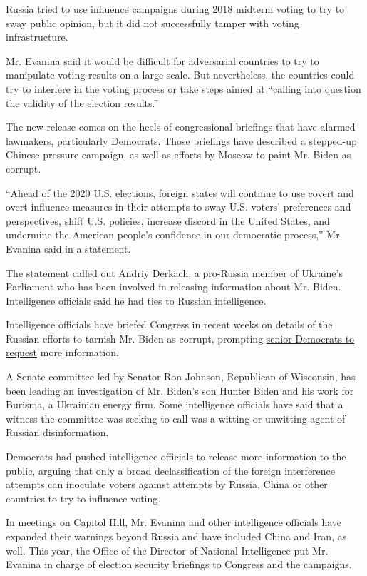 Russia tried to use influence campaigns during 2018 midterm voting to
try to sway public opinion, but it did not successfully tamper with
voting infrastructure.

Mr. Evanina said it would be difficult for adversarial countries to try
to manipulate voting results on a large scale. But nevertheless, the
countries could try to interfere in the voting process or take steps
aimed at ``calling into question the validity of the election results.''

The new release comes on the heels of congressional briefings that have
alarmed lawmakers, particularly Democrats. Those briefings have
described a stepped-up Chinese pressure campaign, as well as efforts by
Moscow to paint Mr. Biden as corrupt.

``Ahead of the 2020 U.S. elections, foreign states will continue to use
covert and overt influence measures in their attempts to sway U.S.
voters' preferences and perspectives, shift U.S. policies, increase
discord in the United States, and undermine the American people's
confidence in our democratic process,'' Mr. Evanina said in a statement.

The statement called out Andriy Derkach, a pro-Russia member of
Ukraine's Parliament who has been involved in releasing information
about Mr. Biden. Intelligence officials said he had ties to Russian
intelligence.

Intelligence officials have briefed Congress in recent weeks on details
of the Russian efforts to tarnish Mr. Biden as corrupt, prompting
\href{https://www.nytimes3xbfgragh.onion/2020/07/20/us/politics/congress-disinformation-biden-russia-ukraine.html}{senior
Democrats to request} more information.

A Senate committee led by Senator Ron Johnson, Republican of Wisconsin,
has been leading an investigation of Mr. Biden's son Hunter Biden and
his work for Burisma, a Ukrainian energy firm. Some intelligence
officials have said that a witness the committee was seeking to call was
a witting or unwitting agent of Russian disinformation.

Democrats had pushed intelligence officials to release more information
to the public, arguing that only a broad declassification of the foreign
interference attempts can inoculate voters against attempts by Russia,
China or other countries to try to influence voting.

\href{https://www.nytimes3xbfgragh.onion/2020/07/24/us/politics/election-interference-russia-china-iran.html}{In
meetings on Capitol Hill}, Mr. Evanina and other intelligence officials
have expanded their warnings beyond Russia and have included China and
Iran, as well. This year, the Office of the Director of National
Intelligence put Mr. Evanina in charge of election security briefings to
Congress and the campaigns.

